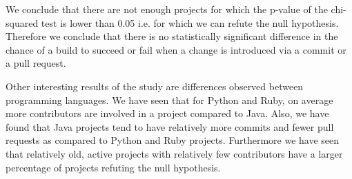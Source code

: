 We conclude that there are not enough projects for which the p-value of the chi-squared test is lower than 0.05 i.e. for which we can refute the null hypothesis.
Therefore we conclude that there is no statistically significant difference in the chance of a build to succeed or fail when a change is introduced via a commit or a pull request.

Other interesting results of the study are differences observed between programming languages. 
We have seen that for Python and Ruby, on average more contributors are involved in a project compared to Java.
Also, we have found that Java projects tend to have relatively more commits and fewer pull requests as compared to Python and Ruby projects.
Furthermore we have seen that relatively old, active projects with relatively few contributors have a larger percentage of projects refuting the null hypothesis.


